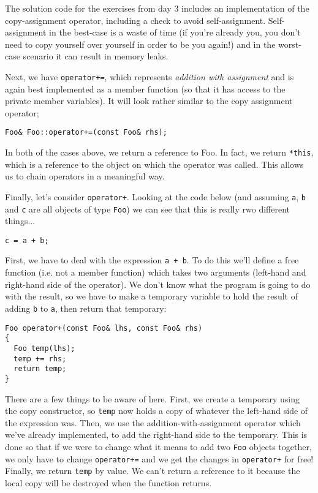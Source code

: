 \documentclass[a4paper]{scrartcl}
\begin{document}
The solution code for the exercises from day 3 includes an implementation of the copy-assignment operator, including a check to avoid self-assignment. Self-assignment in the best-case is a waste of time (if you're already you, you don't need to copy yourself over yourself in order to be you again!) and in the worst-case scenario it can result in memory leaks.

Next, we have \verb|operator+=|, which represents \emph{addition with assignment} and is again best implemented as a member function (so that it has access to the private member variables). It will look rather similar to the copy assignment operator;

\begin{verbatim}
Foo& Foo::operator+=(const Foo& rhs);
\end{verbatim}

In both of the cases above, we return a reference to Foo. In fact, we return \verb|*this|, which is a reference to the object on which the operator was called. This allows us to chain operators in a meaningful way.  

Finally, let's consider \verb|operator+|. Looking at the code below (and assuming \verb|a|, \verb|b| and \verb|c| are all objects of type \verb|Foo|) we can see that this is really rwo different things...

\begin{verbatim}
c = a + b;
\end{verbatim}

First, we have to deal with the expression \verb|a + b|. To do this we'll define a free function (i.e. not a member function) which takes two arguments (left-hand and right-hand side of the operator). We don't know what the program is going to do with the result, so we have to make a temporary variable to hold the result of adding \verb|b| to \verb|a|, then return that temporary:

\begin{verbatim}
Foo operator+(const Foo& lhs, const Foo& rhs)
{
  Foo temp(lhs);
  temp += rhs;
  return temp;
}
\end{verbatim}

There are a few things to be aware of here. First, we create a temporary using the copy constructor, so \verb|temp| now holds a copy of whatever the left-hand side of the expression was. Then, we use the addition-with-assignment operator which we've already implemented, to add the right-hand side to the temporary. This is done so that if we were to change what it means to add two \verb|Foo| objects together, we only have to change \verb|operator+=| and we get the changes in \verb|operator+| for free! Finally, we return \verb|temp| by value. We can't return a reference to it because the local copy will be destroyed when the function returns.
\end{document}

